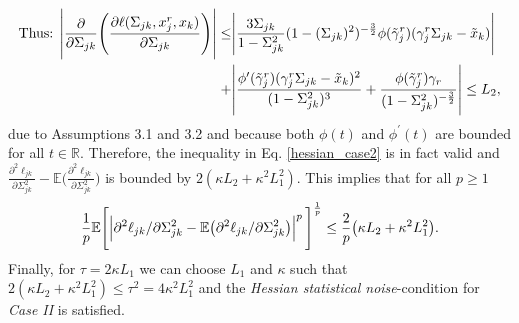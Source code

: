 \begin{condition}
\begin{multline}
\begin{aligned}
            \end{aligned}
    \end{multline} 
    \begin{equation*}
        \begin{split}
            \text{Thus: } \abs{\frac{\partial}{\partial \Sigma_{jk}} \Bigg(\frac{\partial\ell(\Sigma_{jk}, x_j^r,x_k)}{\partial \Sigma_{jk}}\Bigg)} \leq &\abs{\frac{3\Sigma_{jk}}{1-\Sigma_{jk}^2} (1-(\Sigma_{jk})^2)^{-\frac{3}{2}} \phi({\tilde{\gamma}}_j^{r})({\gamma}_j^r\Sigma_{jk} - {\tilde{x}}_{k})} \\
            + &\abs{\frac{\phi^\prime({\tilde{\gamma}}_j^{r})({\gamma}_j^r\Sigma_{jk} - {\tilde{x}}_{k})^2}{(1-\Sigma_{jk}^2)^3} + \frac{\phi({\tilde{\gamma}}_j^{r}){\gamma}_{r}}{(1-\Sigma_{jk}^2)^{-\frac{3}{2}}}} \leq L_2,
        \end{split} 
    \end{equation*}
    due to Assumptions 3.1 and 3.2 %
    and because both $\phi(t)$ and $\phi^{\prime}(t)$ are bounded for all $t\in\mathbb{R}$. Therefore, the inequality in Eq. \eqref{hessian_case2} is in fact valid and $\frac{\partial^2\ell_{jk}}{\partial \Sigma_{jk}^{2}} - \mathbb{E}\bigg(\frac{\partial^2\ell_{jk}}{\partial \Sigma_{jk}^{2}}\bigg)$ is bounded by $2(\kappa L_2 + \kappa^2 L_1^2)$. This implies that for all $p\geq1$
    \begin{equation}
         \frac{1}{p}\mathbb{E}\Bigg[\abs{\partial^2\ell_{jk}/\partial \Sigma_{jk}^{2} - \mathbb{E}\big(\partial^2\ell_{jk}/\partial \Sigma_{jk}^{2}\big)}^p\Bigg]^{\frac{1}{p}} \leq \frac{2}{p}\big(\kappa L_2 + \kappa^2 L_1^2\big).
    \end{equation}
    Finally, for $\tau = 2\kappa L_1$ we can choose $L_1$ and $\kappa$ such that $2(\kappa L_2 + \kappa^2 L_1^2) \leq \tau^2 = 4\kappa^2 L_1^2$ and the \textit{Hessian statistical noise}-condition for \textit{Case II} is satisfied. 
    

\end{condition}
